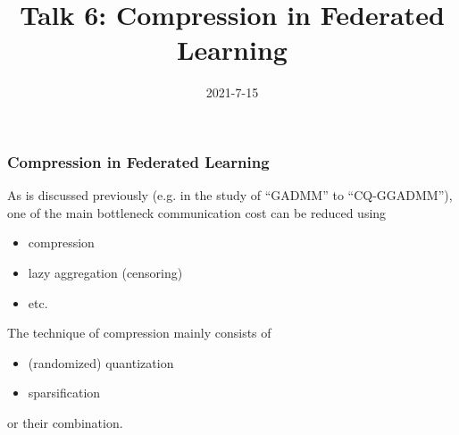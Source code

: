 \usepackage{nccmath}




\title[Compression]{Talk 6: Compression in Federated Learning}
\date{2021-7-15}




\setlength{\belowdisplayskip}{5pt} \setlength{\belowdisplayshortskip}{5pt}
\setlength{\abovedisplayskip}{5pt} \setlength{\abovedisplayshortskip}{5pt}


\begin{frame}
\titlepage %
\end{frame}


\begin{frame}
\frametitle{Compression in Federated Learning}

As is discussed previously (e.g. in the study of ``GADMM'' to ``CQ-GGADMM''), one of the main bottleneck {\color{red} communication cost} can be reduced using
\begin{itemize}
    \item compression
    \item {lazy aggregation (censoring)}
    \item {etc.}
\end{itemize}

\pause
\vspace{0.6em}

The technique of compression mainly consists of
\begin{itemize}
    \item (randomized) quantization
    \item sparsification
\end{itemize}
or their combination.

\end{frame}

